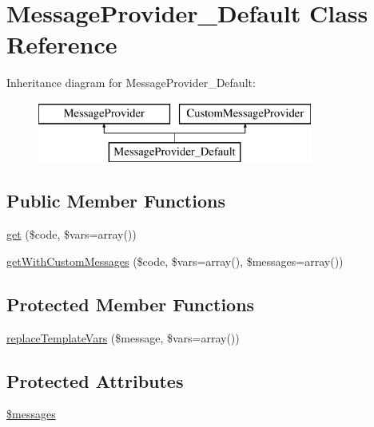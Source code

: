 \hypertarget{class_p_e_a_r2_1_1_console_1_1_command_line_1_1_message_provider___default}{
\section{\-Message\-Provider\-\_\-\-Default \-Class \-Reference}
\label{class_p_e_a_r2_1_1_console_1_1_command_line_1_1_message_provider___default}
}
\-Inheritance diagram for \-Message\-Provider\-\_\-\-Default\-:\begin{figure}[H]
\begin{center}
\leavevmode
\includegraphics[height=2.000000cm]{class_p_e_a_r2_1_1_console_1_1_command_line_1_1_message_provider___default}
\end{center}
\end{figure}
\subsection*{\-Public \-Member \-Functions}
\begin{DoxyCompactItemize}
\item 
\hyperlink{class_p_e_a_r2_1_1_console_1_1_command_line_1_1_message_provider___default_af448a5f2e64ff7a482a69ea3197d0389}{get} (\$code, \$vars=array())
\item 
\hyperlink{class_p_e_a_r2_1_1_console_1_1_command_line_1_1_message_provider___default_acdb5c6fb4f925e7b0c846875d1cc8186}{get\-With\-Custom\-Messages} (\$code, \$vars=array(), \$messages=array())
\end{DoxyCompactItemize}
\subsection*{\-Protected \-Member \-Functions}
\begin{DoxyCompactItemize}
\item 
\hyperlink{class_p_e_a_r2_1_1_console_1_1_command_line_1_1_message_provider___default_af7d8089e2f5a59a12cbf6ae46ea7b7aa}{replace\-Template\-Vars} (\$message, \$vars=array())
\end{DoxyCompactItemize}
\subsection*{\-Protected \-Attributes}
\begin{DoxyCompactItemize}
\item 
\hyperlink{class_p_e_a_r2_1_1_console_1_1_command_line_1_1_message_provider___default_aaf8d38bd4e7d07a3d97cc2f497f6d13f}{\$messages}
\end{DoxyCompactItemize}


